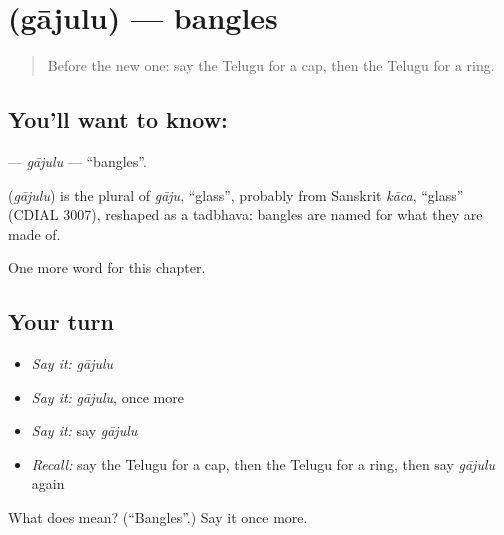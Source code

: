 \section[\texorpdfstring{\te{గాజులు} (gājulu)}{గాజులు (gājulu)}]{ (gājulu) — bangles}

\label{lesson:TE-C115-gajulu}



\begin{quote}
Before the new one: say the Telugu for a cap, then the Telugu for a ring.
\end{quote}

\subsection*{You'll want to know: }
\textbf{} — \emph{gājulu} — \textquotedblleft{}bangles\textquotedblright{}.

\begin{cousinweb}
\textbf{} (\emph{gājulu}) is the plural of \emph{gāju}, \textquotedblleft{}glass\textquotedblright{}, probably from Sanskrit \emph{kāca}, \textquotedblleft{}glass\textquotedblright{} (CDIAL 3007), reshaped as a tadbhava: bangles are named for what they are made of.
\end{cousinweb}

\begin{grammarlens}[title={What you've built}]
One more word for this chapter.
\end{grammarlens}

\subsection*{Your turn}
\begin{itemize}
\raggedright
  \item \emph{Say it:} \emph{gājulu}
  \item \emph{Say it:} \emph{gājulu}, once more
  \item \emph{Say it:} say \emph{gājulu}
  \item \emph{Recall:} say the Telugu for a cap, then the Telugu for a ring, then say \emph{gājulu} again
\end{itemize}

\begin{tcolorbox}[breakable,colback=teal!4,colframe=teal!35!black,title={Before you move on}]
What does  mean? (\textquotedblleft{}Bangles\textquotedblright{}.) Say it once more.
\end{tcolorbox}
